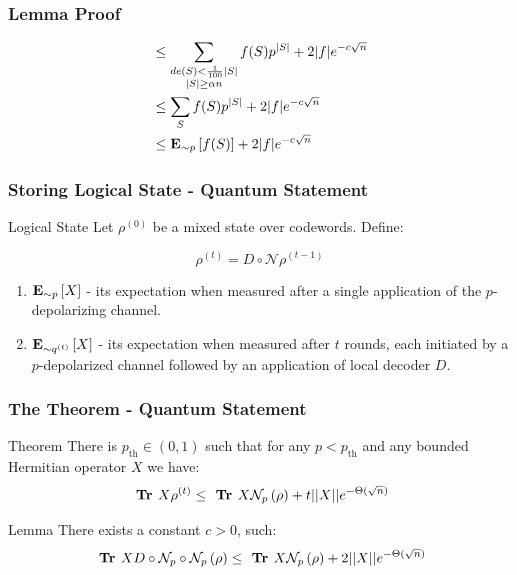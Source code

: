 \documentclass{beamer}
\begin{document}
\begin{frame}
  \frametitle{Lemma Proof}
  \begin{align*}
  & \le \sum_{\substack{ de(S) < \frac{1}{100}|S| \\ |S| \ge \alpha n } }{ f (S) p^{|S|} } + 2|f| e^{-c\sqrt{n}}\\
  & \le \sum_{ S }{ f (S) p^{|S|} } + 2|f| e^{-c\sqrt{n}}\\
  & \le \exppm{ f (S) }{\sim p } + 2|f| e^{-c\sqrt{n}}
\end{align*}
\end{frame}


\begin{frame}
  \frametitle{Storing Logical State - Quantum Statement}

  \begin{block}{Logical State}
    Let $\rho^{(0)}$ be a mixed state over codewords. Define:

    \begin{equation*}
        \rho^{(t)} =  D \circ \mathcal{N} \rho^{(t-1)} 
    \end{equation*}

    \begin{enumerate}
      \item $\exppm{X}{ \sim p  }$ - its expectation when measured after a single application of the $p$-depolarizing channel.
      \item $\exppm{X}{ \sim q^{(t)}  }$ - its expectation when measured after $t$ rounds, each initiated by a $p$-depolarized channel followed by an application of local decoder $D$.
    \end{enumerate}
  \end{block}
\end{frame}


\begin{frame}  
  \frametitle{The Theorem - Quantum Statement} 
  \begin{block}{Theorem} There is $p_{\text{th}} \in (0,1)$ such that for any $p < p_{\text{th}}$ and any bounded Hermitian operator $X$ we have: 
    \begin{equation*}
      \Tr X\rho^{(t)} \le \Tr X  \mathcal{N}_{p} \left( \rho \right)  + t||X|| e^{- \Theta( \sqrt{n}) }
    \end{equation*}
\end{block}

\begin{block}{Lemma} There exists a constant $c >0 $, such:
    \begin{equation*}
      \Tr X  D \circ \mathcal{N}_{p} \circ \mathcal{N}_{p} \left( \rho \right)  \le \Tr X  \mathcal{N}_{p} \left( \rho \right)  + 2||X|| e^{- \Theta( \sqrt{n}) }
    \end{equation*}
\end{block}
\end{frame}
\end{document}
